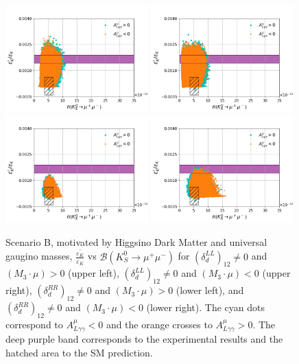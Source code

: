 \begin{figure}[h!]
\centering
\includegraphics[width=0.49\textwidth]{figs/figure_2_SCB_LL_pos.png}
\includegraphics[width=0.49\textwidth]{figs/figure_2_SCB_LL_neg.png}\\
\includegraphics[width=0.49\textwidth]{figs/figure_2_SCB_RR_pos.png}
\includegraphics[width=0.49\textwidth]{figs/figure_2_SCB_RR_neg.png}
\caption{\label{fig:eps_SCB} Scenario B, motivated by Higgsino Dark Matter and universal gaugino masses, $\frac{\varepsilon ^\prime_K}{\varepsilon_K}$ vs $\mathcal{B}(K_S^0\rightarrow\mu^+\mu^-)$ for $\left( \delta_{d}^{LL} \right)_{12}\neq 0$ and $(M_3\cdot\mu)>0$ (upper left), $\left(\delta_{d}^{LL}\right)_{12}\neq 0$ and $(M_3\cdot\mu)<0$ (upper right), $\left(\delta_{d}^{RR}\right)_{12}\neq 0$ and $(M_3\cdot\mu)>0$ (lower left), and $\left( \delta_{d}^{RR} \right)_{12}\neq 0$ and $(M_3\cdot\mu)<0$ (lower right). The cyan dots correspond to $A^\mu_{L\gamma \gamma} < 0$ and the orange crosses to $A^\mu_{L\gamma \gamma} > 0$. The deep purple band corresponds to the experimental results and the hatched area to the SM prediction.}
\end{figure}

